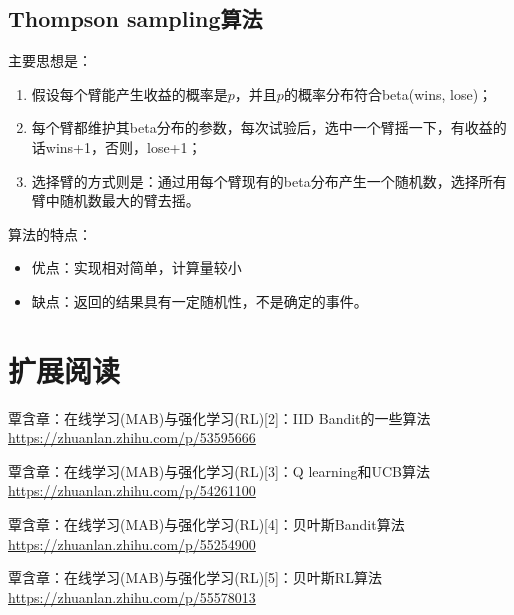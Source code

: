 \documentclass[12pt]{article}
\begin{document}
\subsection{Thompson sampling算法}
主要思想是：
\begin{enumerate}
\setlength{\itemsep}{0pt}
\setlength{\parsep}{0pt}
\setlength{\parskip}{0pt}
    \item 假设每个臂能产生收益的概率是$p$，并且$p$的概率分布符合beta(wins, lose)；
    \item 每个臂都维护其beta分布的参数，每次试验后，选中一个臂摇一下，有收益的话wins+1，否则，lose+1；
    \item 选择臂的方式则是：通过用每个臂现有的beta分布产生一个随机数，选择所有臂中随机数最大的臂去摇。
\end{enumerate}

算法的特点：
\begin{itemize}
\setlength{\itemsep}{0pt}
\setlength{\parsep}{0pt}
\setlength{\parskip}{0pt}
    \item 优点：实现相对简单，计算量较小
    \item 缺点：返回的结果具有一定随机性，不是确定的事件。
\end{itemize}

\section{扩展阅读}
覃含章：在线学习(MAB)与强化学习(RL)[2]：IID Bandit的一些算法
\url{https://zhuanlan.zhihu.com/p/53595666}

覃含章：在线学习(MAB)与强化学习(RL)[3]：Q learning和UCB算法
\url{https://zhuanlan.zhihu.com/p/54261100}

覃含章：在线学习(MAB)与强化学习(RL)[4]：贝叶斯Bandit算法
\url{https://zhuanlan.zhihu.com/p/55254900}

覃含章：在线学习(MAB)与强化学习(RL)[5]：贝叶斯RL算法
\url{https://zhuanlan.zhihu.com/p/55578013}




\end{document}
